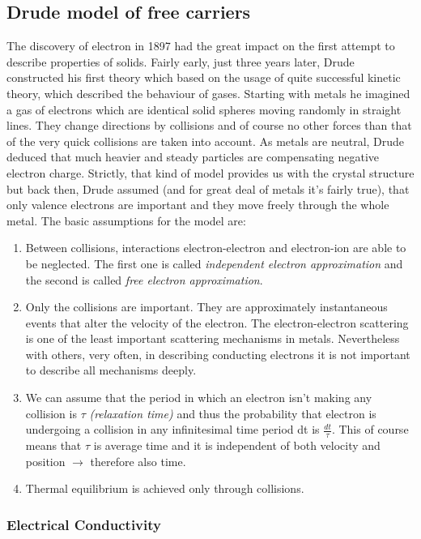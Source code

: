 \subsection{Drude model of free carriers}
The discovery of electron in 1897 had the great impact on the first attempt to describe properties of solids. Fairly early, just three years later, Drude constructed his first theory which based on the usage of quite successful kinetic theory, which described the behaviour of gases. Starting with metals he imagined a gas of electrons which are identical solid spheres moving randomly in straight lines. They change directions by collisions and of course no other forces than that of the very quick collisions are taken into account. As metals are neutral, Drude deduced that much heavier and steady particles are compensating negative electron charge. Strictly, that kind of model provides us with the crystal structure but back then, Drude assumed (and for great deal of metals it's fairly true), that only valence electrons are important and they move freely through the whole metal. The basic assumptions for the model are:
\begin{enumerate}
\item Between collisions, interactions electron-electron and electron-ion are able to be neglected. The first one is called \textit{independent electron approximation} and the second is called \textit{free electron approximation}. 
\item Only the collisions are important. They are approximately instantaneous events that alter the velocity of the electron. The electron-electron scattering is one of the least important scattering mechanisms in metals. Nevertheless with others, very often, in describing conducting electrons it is not important to describe all mechanisms deeply. 
\item We can assume that the period in which an electron isn't making any collision is $\tau$ \textit{(relaxation time)} and thus the probability that electron is undergoing a collision in any infinitesimal time period dt is $\frac{dt}{\tau}$. This of course means that $\tau$ is average time and it is independent of both velocity and position $\rightarrow$ therefore also time. 
\item Thermal equilibrium is achieved only through collisions.
\end{enumerate}

\subsubsection{Electrical Conductivity}

